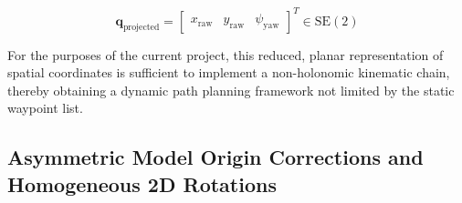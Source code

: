 \begin{equation}
\mathbf{q}_{\text{projected}} = \begin{bmatrix} x_{\text{raw}} & y_{\text{raw}} & \psi_{\text{yaw}} \end{bmatrix}^T \in \text{SE}(2)
\label{eq:projected_pose_vector}
\end{equation}

For the purposes of the current project, this reduced, planar representation of spatial coordinates is sufficient to implement a non-holonomic kinematic chain, thereby obtaining a dynamic path planning framework not limited by the static waypoint list.

\subsection{Asymmetric Model Origin Corrections and Homogeneous 2D Rotations}

